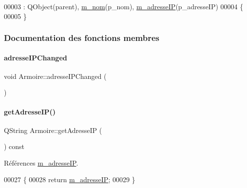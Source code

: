 \begin{DoxyCode}
00003                                                                     : QObject(parent), 
      \hyperlink{class_armoire_a6d5fc6a37737b4822dc89191a79f6b7b}{m\_nom}(p\_nom), \hyperlink{class_armoire_ae92e8c48f53e69b871e7f70d9af19ffa}{m\_adresseIP}(p\_adresseIP)
00004 \{
00005 \}
\end{DoxyCode}


\subsubsection{Documentation des fonctions membres}
\mbox{\label{class_armoire_a97945eb55aa0acea7a74ab6c986534e4}} 
\paragraph{\texorpdfstring{adresse\+I\+P\+Changed}{adresseIPChanged}}
{\footnotesize\ttfamily void Armoire\+::adresse\+I\+P\+Changed (\begin{DoxyParamCaption}{ }\end{DoxyParamCaption})\hspace{0.3cm}{\ttfamily [signal]}}

\mbox{\label{class_armoire_a5196fec5f44f63216ddce5fbc512c919}} 
\paragraph{\texorpdfstring{get\+Adresse\+I\+P()}{getAdresseIP()}}
{\footnotesize\ttfamily Q\+String Armoire\+::get\+Adresse\+IP (\begin{DoxyParamCaption}{ }\end{DoxyParamCaption}) const}



Références \hyperlink{class_armoire_ae92e8c48f53e69b871e7f70d9af19ffa}{m\+\_\+adresse\+IP}.


\begin{DoxyCode}
00027 \{
00028     \textcolor{keywordflow}{return} \hyperlink{class_armoire_ae92e8c48f53e69b871e7f70d9af19ffa}{m\_adresseIP};
00029 \}
\end{DoxyCode}
\mbox{\label{class_armoire_a0045e45e0c9a465af765667344ce8bee}} 
